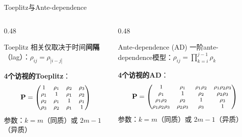 \documentclass[aspectratio=169,11pt]{beamer}
\newcommand{\bP}{\mathbf{P}}
\begin{document}
\begin{frame}{Toeplitz与Ante-dependence}
\begin{columns}[T,totalwidth=\textwidth]
\begin{column}{0.48\textwidth}
\begin{block}{\footnotesize Toeplitz}
\footnotesize
相关仅取决于时间\textbf{间隔}（lag）：$\rho_{ij} = \rho_{|i-j|}$

\textbf{4个访视的Toeplitz}：
\vspace{-0.2cm}
\[
\footnotesize
\bP = \begin{pmatrix}
1 & \rho_1 & \rho_2 & \rho_3 \\
\rho_1 & 1 & \rho_1 & \rho_2 \\
\rho_2 & \rho_1 & 1 & \rho_1 \\
\rho_3 & \rho_2 & \rho_1 & 1
\end{pmatrix}
\]
\vspace{-0.1cm}
参数：$k = m$（同质）或 $2m-1$（异质）
\end{block}
\end{column}
\begin{column}{0.48\textwidth}
\begin{block}{\footnotesize Ante-dependence (AD)}
\footnotesize
一阶ante-dependence模型：$\rho_{ij} = \prod_{k=i}^{j-1} \rho_k$

\textbf{4个访视的AD}：
\vspace{-0.2cm}
\[
\footnotesize
\bP = \begin{pmatrix}
1 & \rho_1 & \rho_1\rho_2 & \rho_1\rho_2\rho_3 \\
\rho_1 & 1 & \rho_2 & \rho_2\rho_3 \\
\rho_1\rho_2 & \rho_2 & 1 & \rho_3 \\
\rho_1\rho_2\rho_3 & \rho_2\rho_3 & \rho_3 & 1
\end{pmatrix}
\]
\vspace{-0.1cm}
参数：$k = m$（同质）或 $2m-1$（异质）
\end{block}
\end{column}
\end{columns}
\end{frame}
\end{document}
